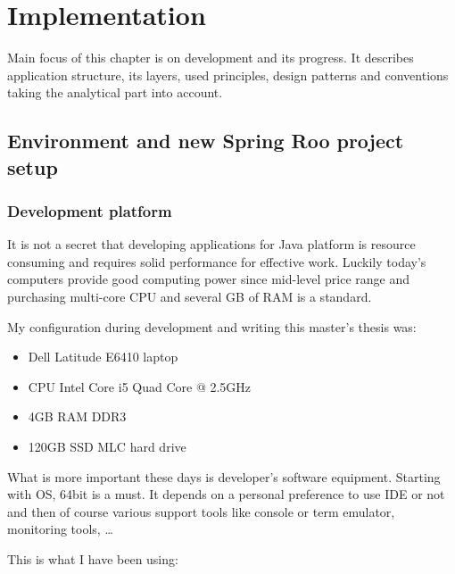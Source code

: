 \chapter{Implementation}\label{cha:implementation}

	Main focus of this chapter is on development and its progress. It describes application structure, its layers, used
	principles, design patterns and conventions taking the analytical part into account.

	\section{Environment and new Spring Roo project setup}
	
	\subsection{Development platform}
	
	It is not a secret that developing applications for Java platform is resource consuming and requires solid performance
	for effective work. Luckily today's computers provide good computing power since mid-level price range and purchasing
	multi-core CPU and several GB of RAM is a standard.
	
	My configuration during development and writing this master's thesis was:
	
	\begin{itemize}
		\item Dell Latitude E6410 laptop
		\item CPU Intel Core i5 Quad Core @ 2.5GHz
		\item 4GB RAM DDR3
		\item 120GB SSD MLC hard drive 
	\end{itemize}
	
	What is more important these days is developer's software equipment. Starting with OS, 64bit is a must. It depends on
	a personal preference to use IDE or not and then of course various support tools like console or term emulator,
	monitoring tools, \ldots

	This is what I have been using:	

